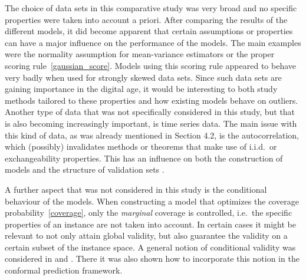 \documentclass[smallcondensed]{svjour3}
\begin{document}
    The choice of data sets in this comparative study was very broad and no specific properties were taken into account a priori. After comparing the results of the different models, it did become apparent that certain assumptions or properties can have a major influence on the performance of the models. The main examples were the normality assumption for mean-variance estimators or the proper scoring rule~\eqref{gaussian_score}. Models using this scoring rule appeared to behave very badly when used for strongly skewed data sets. Since such data sets are gaining importance in the digital age, it would be interesting to both study methods tailored to these properties and how existing models behave on outliers. Another type of data that was not specifically considered in this study, but that is also becoming increasingly important, is time series data. The main issue with this kind of data, as was already mentioned in Section 4.2, is the autocorrelation, which (possibly) invalidates methods or theorems that make use of i.i.d.\ or exchangeability properties. This has an influence on both the construction of models and the structure of validation sets \cite{chernozhukov2018exact}.

    A further aspect that was not considered in this study is the conditional behaviour of the models. When constructing a model that optimizes the coverage probability~\eqref{coverage}, only the \textit{marginal} coverage is controlled, i.e.\ the specific properties of an instance are not taken into account. In certain cases it might be relevant to not only attain global validity, but also guarantee the validity on a certain subset of the instance space. A general notion of conditional validity was considered in \cite{lei2014distribution} and \cite{vovk2012conditional}. There it was also shown how to incorporate this notion in the conformal prediction framework.





\end{document}
